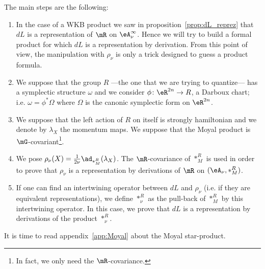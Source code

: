 The main steps are the following:
{\renewcommand{\theenumi}{\arabic{enumi}.}
\begin{enumerate}
	\item In the case of a WKB product we saw in proposition~\ref{prop:dL_reprez} that $dL$ is a representation of $\mR$ on $\eA_{\nu}^{\infty}$. Hence we will try to build a formal product for which $dL$ is a representation by derivation. From this point of view, the manipulation with $\rho_{\nu}$ is only a trick designed to guess a product formula.

	\item We suppose that the group $R$ ---the one that we are trying to quantize--- has a symplectic structure $\omega$ and we consider $\phi\colon \eR^{2n}\to R$, a Darboux chart; i.e. $\omega=\phi^*\Omega$ where $\Omega$ is the canonic symplectic form on $\eR^{2n}$.

	\item We suppose that the left action of $R$ on itself is strongly hamiltonian and we denote by $\lambda_X$ the momentum maps. We suppose that the Moyal product is $\mG$-covariant\footnote{In fact, we only need the $\mR$-covariance.}.

	\item We pose $\rho_{\nu}(X)=\frac{1}{ 2\nu }\ad_{\ast_M^R}(\lambda_X)$. The $\mR$-covariance of $\ast_M^R$ is used in order to prove that $\rho_{\nu}$ is a  representation by derivations of $\mR$ on $(\eA_{\nu},\ast_M^R)$.
	\item If one can find an intertwining operator between $dL$ and $\rho_{\nu}$ (i.e. if they are equivalent representations), we define $\ast_{\nu}^R$ as the pull-back of $\ast_M^R$ by this intertwining operator. In this case, we prove that $dL$ is a representation by derivations of the product $\ast_{\nu}^R$.
\end{enumerate}

}       %
It is time to read appendix~\ref{app:Moyal} about the Moyal star-product.

